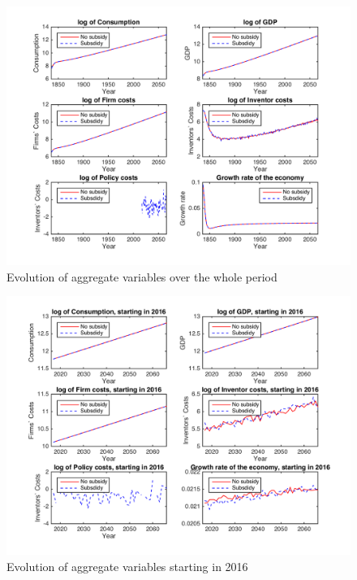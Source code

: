 \documentclass[a4paper,11pt]{article}
\theoremstyle{prop}
\theoremstyle{lemma}
\begin{document}
\begin{figure}
\centering
\includegraphics[scale=.6]{aggregatesNC_50y}
\caption{Evolution of aggregate variables over the whole period}
\end{figure}

\begin{figure}
\centering
\includegraphics[scale=.6]{aggregates2016NC_50y}
\caption{Evolution of aggregate variables starting in 2016}
\end{figure}
\end{document}
